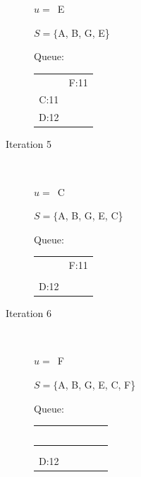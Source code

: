\documentclass[12pt]{article}
\begin{document}
\begin{description}
$u =$\ E

$S = \{$A, B, G, E\}

Queue:\\
\begin{tabular}{|c|c|}\hline
                & \\\hline
                & F:11\\\hline
    C:11        & \\\hline
    D:12        & \\\hline
\end{tabular}
\item [Iteration 5]\ 

$u =$\ C

$S = \{$A, B, G, E, C\}

Queue:\\
\begin{tabular}{|c|c|}\hline
                & \\\hline
                & F:11\\\hline
                & \\\hline
    D:12        & \\\hline
\end{tabular}
\item [Iteration 6]\ 

$u =$\ F

$S = \{$A, B, G, E, C, F\}

Queue:\\
\begin{tabular}{|c|c|}\hline
                & \ \ \ \ \ \ \\\hline
                & \\\hline
                & \\\hline
    D:12        & \\\hline
\end{tabular}
\end{description} 
\end{document}
